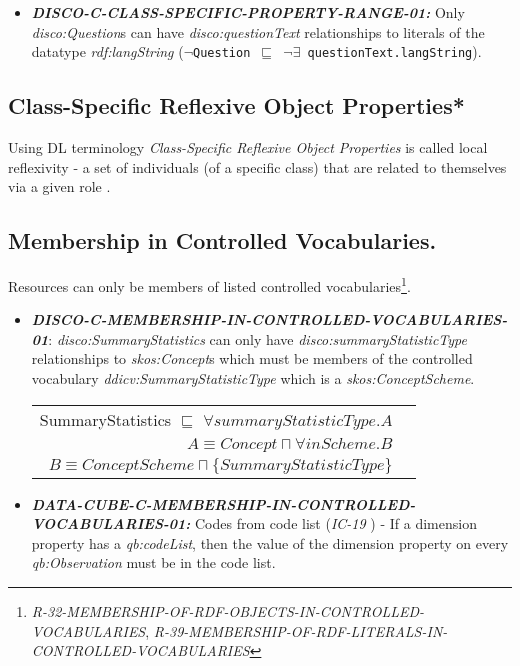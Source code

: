 \documentclass{llncs}
\newcommand{\ms}[1]{\texttt{#1}}
\newenvironment{DL}{
  \vspace{0cm}
  \begin{tabular}{r l}

}{
  \end{tabular}
}
\begin{document}
\begin{itemize}
	\item \textbf{{\em DISCO-C-CLASS-SPECIFIC-PROPERTY-RANGE-01:}} 
Only {\em disco:Question}s can have {\em disco:questionText} relationships to literals of the datatype {\em rdf:langString} (\ms{$\neg$Question $\sqsubseteq$ $\neg\exists$ questionText.langString}).
\end{itemize}

\subsection{Class-Specific Reflexive Object Properties*}

Using DL terminology \emph{Class-Specific Reflexive Object Properties} is called local reflexivity - a set of individuals (of a specific class) that are related to themselves via a given role \cite{Kroetzsch2012}.

\subsection{Membership in Controlled Vocabularies.}

Resources can only be members of listed controlled vocabularies\footnote{{\em R-32-MEMBERSHIP-OF-RDF-OBJECTS-IN-CONTROLLED-VOCABULARIES}, 
{\em R-39-MEMBERSHIP-OF-RDF-LITERALS-IN-CONTROLLED-VOCABULARIES}}.

\begin{itemize}
	\item \textbf{{\em DISCO-C-MEMBERSHIP-IN-CONTROLLED-VOCABULARIES-01}}:
{\em disco:SummaryStatistics} can only have {\em disco:summaryStatisticType} relationships to {\em skos:Concept}s which must be members of the controlled vocabulary {\em ddicv:SummaryStatisticType} which is a {\em skos:ConceptScheme}.

\begin{DL}
SummaryStatistics $\sqsubseteq$ $\forall summaryStatisticType.A$ \\
$A \equiv Concept \sqcap \forall inScheme . B$ \\
$B \equiv ConceptScheme \sqcap \{SummaryStatisticType\}$
\end{DL}
\end{itemize}

\begin{itemize}
	\item \textbf{{\em DATA-CUBE-C-MEMBERSHIP-IN-CONTROLLED-VOCABULARIES-01:}}
	Codes from code list (\emph{IC-19} \cite{CyganiakReynolds2014}) - 
	If a dimension property has a \emph{qb:codeList}, then the value of the dimension property on every \emph{qb:Observation} must be in the code list. 
\end{itemize}
\end{document}
